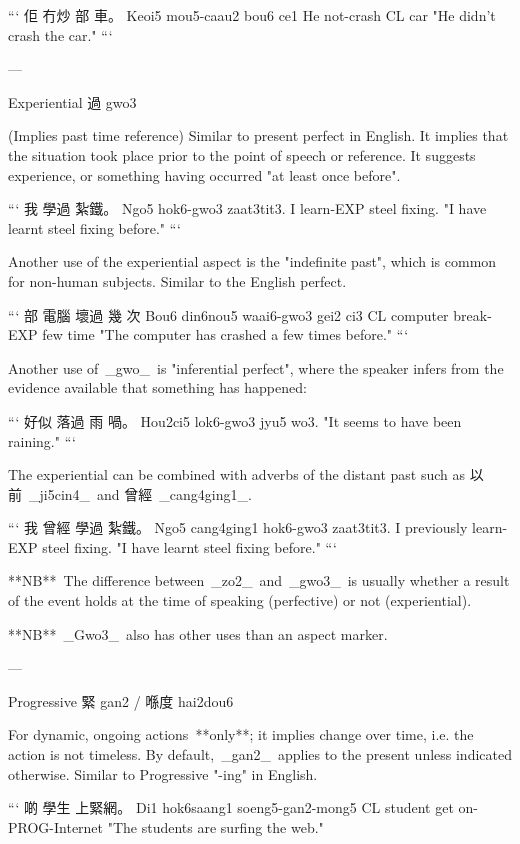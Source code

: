 ```
佢      冇炒         部     車。
Keoi5   mou5-caau2   bou6   ce1  
He      not-crash    CL     car
"He didn't crash the car."
```

---

Experiential 過 gwo3

(Implies past time reference) Similar to present perfect in English. It implies that the situation took place prior to the point of speech or reference. It suggests experience, or something having occurred "at least once before".

```
我   學過        紮鐵。  
Ngo5 hok6-gwo3   zaat3tit3.  
I    learn-EXP  steel fixing.
"I have learnt steel fixing before."  
```

Another use of the experiential aspect is the "indefinite past", which is common for non-human subjects. Similar to the English perfect.

```
部    電腦      壞過         幾   次
Bou6  din6nou5  waai6-gwo3  gei2  ci3
CL    computer  break-EXP  few  time
"The computer has crashed a few times before."
```

Another use of _gwo_ is "inferential perfect", where the speaker infers from the evidence available that something has happened:

```
好似      落過       雨    喎。
Hou2ci5  lok6-gwo3  jyu5  wo3.
"It seems to have been raining."
```

The experiential can be combined with adverbs of the distant past such as 以前 _ji5cin4_ and 曾經 _cang4ging1_.

```
我   曾經         學過       紮鐵。  
Ngo5 cang4ging1  hok6-gwo3  zaat3tit3.  
I    previously  learn-EXP  steel fixing.
"I have learnt steel fixing before."  
```

**NB** The difference between _zo2_ and _gwo3_ is usually whether a result of the event holds at the time of speaking (perfective) or not (experiential).

**NB** _Gwo3_ also has other uses than an aspect marker.

---

Progressive 緊 gan2 / 喺度 hai2dou6

For dynamic, ongoing actions **only**; it implies change over time, i.e. the action is not timeless. By default, _gan2_ applies to the present unless indicated otherwise. Similar to Progressive "-ing" in English.

```
啲  學生        上緊網。  
Di1 hok6saang1  soeng5-gan2-mong5  
CL  student     get on-PROG-Internet
"The students are surfing the web."  

